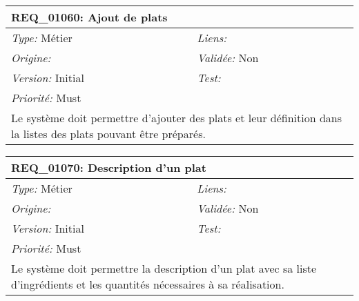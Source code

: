 \begin{table}[!h]

\begin{tabular}{|p{60mm}p{100mm}|}

\hline

\multicolumn{2}{|l|}{\textbf{REQ\_01060:} Ajout de plats} \\ \hline

\emph{Type:} Métier & \emph{Liens:}  \\

\emph{Origine:}  & \emph{Validée:} Non \\

\emph{Version:} Initial & \emph{Test:}  \\

\emph{Priorité:} Must & \\ \hline

\multicolumn{2}{|p{16cm}|}{Le système doit permettre d'ajouter des plats et leur définition dans la listes des plats pouvant être préparés.} \\ \hline

\end{tabular}

\end{table}



\begin{table}[!h]

\begin{tabular}{|p{60mm}p{100mm}|}

\hline

\multicolumn{2}{|l|}{\textbf{REQ\_01070:} Description d'un plat} \\ \hline

\emph{Type:} Métier & \emph{Liens:}  \\

\emph{Origine:}  & \emph{Validée:} Non \\

\emph{Version:} Initial & \emph{Test:}  \\

\emph{Priorité:} Must & \\ \hline

\multicolumn{2}{|p{16cm}|}{Le système doit permettre la description d'un plat avec sa liste d'ingrédients et les quantités nécessaires à sa réalisation.} \\ \hline

\end{tabular}

\end{table}



